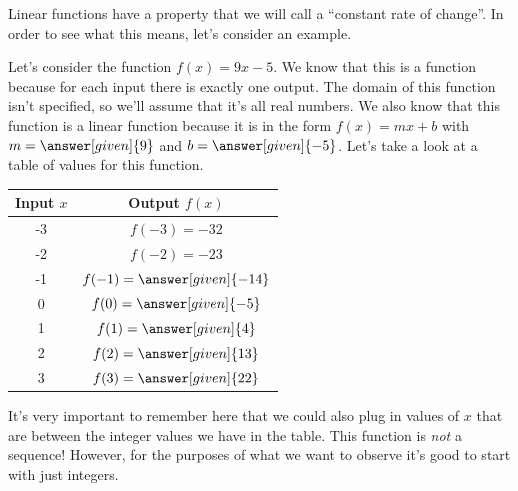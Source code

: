\documentclass{ximera}
\begin{document}
Linear functions have a property that we will call a ``constant rate of change''. In order to see what this means, let's consider an example.
\begin{example}
Let's consider the function $f(x) = 9x-5$. We know that this is a function because for each input there is exactly one output. The domain of this function isn't specified, so we'll assume that it's all real numbers. We also know that this function is a linear function because it is in the form $f(x) = mx+b$ with $m=\answer[given]{9}$ and $b=\answer[given]{-5}$. Let's take a look at a table of values for this function.
\begin{image}
\begin{tabular}{c|c}
Input $x$ & Output $f(x)$ \\ \hline
-3 & $f(-3) = -32$ \\ \hline
-2 & $f(-2) = -23$ \\ \hline
-1 & $f(-1) = \answer[given]{-14}$ \\ \hline
0 & $f(0) = \answer[given]{-5}$ \\ \hline
1 & $f(1) = \answer[given]{4}$ \\ \hline
2 & $f(2) = \answer[given]{13}$ \\ \hline
3 & $f(3) = \answer[given]{22}$ \\ \hline
\end{tabular}
\end{image}
It's very important to remember here that we could also plug in values of $x$ that are between the integer values we have in the table. This function is \emph{not} a sequence! However, for the purposes of what we want to observe it's good to start with just integers.


\end{example}
\end{document}

